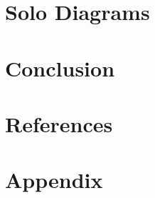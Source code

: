 \documentclass[twoside]{article}
\begin{document}
    \section{Solo Diagrams}
        
        
        

    \section{Conclusion}

    \section{References}
        

    \section{Appendix}
        
\end{document}
